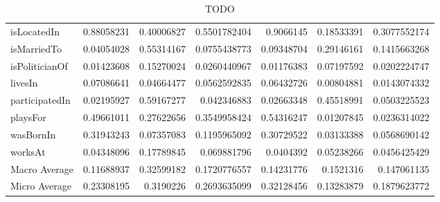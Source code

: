 \begin{table}[htbp]
\begin{tabular}{lrrrrrr}
 isLocatedIn & 0.88058231 & 0.40006827 & 0.5501782404 & 0.9066145 & 0.18533391 & 0.3077552174 \\ 
 isMarriedTo & 0.04054028 & 0.55314167 & 0.0755438773 & 0.09348704 & 0.29146161 & 0.1415663268 \\ 
 isPoliticianOf & 0.01423608 & 0.15270024 & 0.0260440967 & 0.01176383 & 0.07197592 & 0.0202224747 \\ 
 livesIn & 0.07086641 & 0.04664477 & 0.0562592835 & 0.06432726 & 0.00804881 & 0.0143074332 \\ 
 participatedIn & 0.02195927 & 0.59167277 & 0.042346883 & 0.02663348 & 0.45518991 & 0.0503225523 \\ 
 playsFor & 0.49661011 & 0.27622656 & 0.3549958424 & 0.54316247 & 0.01207845 & 0.0236314022 \\ 
 wasBornIn & 0.31943243 & 0.07357083 & 0.1195965092 & 0.30729522 & 0.03133388 & 0.0568690142 \\ 
 worksAt & 0.04348096 & 0.17789845 & 0.069881796 & 0.0404392 & 0.05238266 & 0.0456425429 \\ 
 Macro Average & 0.11688937 & 0.32599182 & 0.1720776557 & 0.14231776 & 0.1521316 & 0.147061135 \\ 
 Micro Average & 0.23308195 & 0.3190226 & 0.2693635099 & 0.32128456 & 0.13283879 & 0.1879623772 \\ 
 \end{tabular}
 \caption{TODO}
 \label{t:confidence}
 \end{table}

